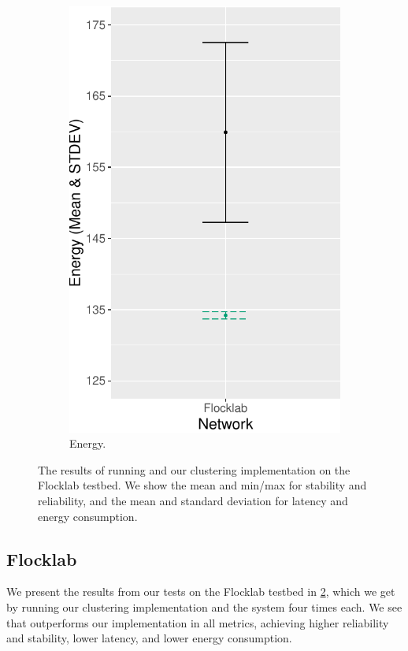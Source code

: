\begin{figure}[bt]
\begin{subfigure}{0.24\textwidth}
        \includegraphics[width=\textwidth, keepaspectratio]{figure/Results/ChaosComparison/Flocklab/FlocklabComparison_Energy.pdf}
        \caption{Energy.}
        \label{subfig:flocklab-energy}
    \end{subfigure}
    \caption{The results of running \atwo{} and our clustering implementation on the Flocklab testbed. We show the mean and min/max for stability and reliability, and the mean and standard deviation for latency and energy consumption.}
    \label{fig:flocklab-results}
\end{figure}



\subsection{Flocklab}
We present the results from our tests on the Flocklab testbed in \cref{fig:flocklab-results}, which we get by running our clustering implementation and the \atwo{} system four times each. We see that \atwo{} outperforms our implementation in all metrics, achieving higher reliability and stability, lower latency, and lower energy consumption.

